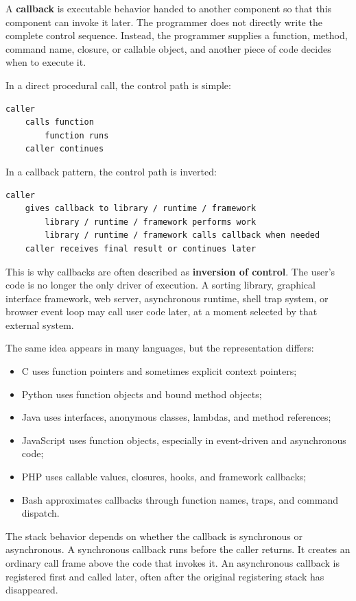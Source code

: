 \documentclass[a4paper,twoside]{report}
\begin{document}
A \textbf{callback} is executable behavior handed to another component so that this component can invoke it later. The programmer does not directly write the complete control sequence. Instead, the programmer supplies a function, method, command name, closure, or callable object, and another piece of code decides when to execute it.

In a direct procedural call, the control path is simple:

\begin{verbatim}
caller
    calls function
        function runs
    caller continues
\end{verbatim}

In a callback pattern, the control path is inverted:

\begin{verbatim}
caller
    gives callback to library / runtime / framework
        library / runtime / framework performs work
        library / runtime / framework calls callback when needed
    caller receives final result or continues later
\end{verbatim}

This is why callbacks are often described as \textbf{inversion of control}. The user's code is no longer the only driver of execution. A sorting library, graphical interface framework, web server, asynchronous runtime, shell trap system, or browser event loop may call user code later, at a moment selected by that external system.

The same idea appears in many languages, but the representation differs:

\begin{itemize}
    \item C uses function pointers and sometimes explicit context pointers;
    \item Python uses function objects and bound method objects;
    \item Java uses interfaces, anonymous classes, lambdas, and method references;
    \item JavaScript uses function objects, especially in event-driven and asynchronous code;
    \item PHP uses callable values, closures, hooks, and framework callbacks;
    \item Bash approximates callbacks through function names, traps, and command dispatch.
\end{itemize}

The stack behavior depends on whether the callback is synchronous or asynchronous. A synchronous callback runs before the caller returns. It creates an ordinary call frame above the code that invokes it. An asynchronous callback is registered first and called later, often after the original registering stack has disappeared.
\end{document}
